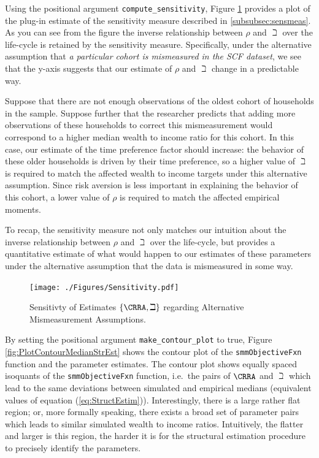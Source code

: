 \documentclass[titlepage, headings=optiontotocandhead]{econtex}
\begin{document}
Using the positional argument \texttt{compute\_sensitivity}, Figure \ref{fig:PlotSensitivityMeasure} provides a plot of the plug-in estimate of the sensitivity measure described in \ref{subsubsec:sensmeas}. As you can see from the figure the inverse relationship between $\rho$ and $\beth$ over the life-cycle is retained by the sensitivity measure. Specifically, under the alternative assumption that \textit{a particular cohort is mismeasured in the SCF dataset}, we see that the y-axis suggests that our estimate of $\rho$ and $\beth$ change in a predictable way.

Suppose that there are not enough observations of the oldest cohort of households in the sample. Suppose further that the researcher predicts that adding more observations of these households to correct this mismeasurement would correspond to a higher median wealth to income ratio for this cohort. In this case, our estimate of the time preference factor should increase: the behavior of these older households is driven by their time preference, so a higher value of $\beth$ is required to match the affected wealth to income targets under this alternative assumption. Since risk aversion is less important in explaining the behavior of this cohort, a lower value of $\rho$ is required to match the affected empirical moments.

To recap, the sensitivity measure not only matches our intuition about the inverse relationship between $\rho$ and $\beth$ over the life-cycle, but provides a quantitative estimate of what would happen to our estimates of these parameters under the alternative assumption that the data is mismeasured in some way.

\hypertarget{PlotSensitivityMeasure}{}
\begin{figure}
  \texttt{[image: ./Figures/Sensitivity.pdf]}
  \caption{Sensitivty of Estimates $\{\CRRA,\beth\}$ regarding Alternative Mismeasurement Assumptions.}
  \label{fig:PlotSensitivityMeasure}
\end{figure}

By setting the positional argument \texttt{make\_contour\_plot} to true, Figure \ref{fig:PlotContourMedianStrEst} shows the contour plot of the \texttt{smmObjectiveFxn} function and the parameter estimates. The contour plot shows equally spaced isoquants of the \texttt{smmObjectiveFxn} function, i.e.\ the pairs of $\CRRA$ and $\beth$ which lead to the same deviations between simulated and empirical medians (equivalent values of equation (\ref{eq:StructEstim})). Interestingly, there is a large rather flat region; or, more formally speaking, there exists a broad set of parameter pairs which leads to similar simulated wealth to income ratios. Intuitively, the flatter and larger is this region, the harder it is for the structural estimation procedure to precisely identify the parameters.
\end{document}
